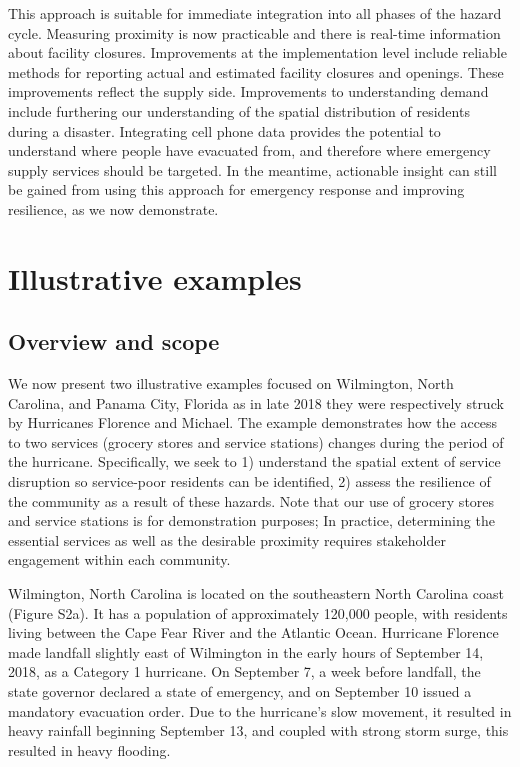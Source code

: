 \documentclass[9pt,twocolumn,twoside,lineno]{pnas-new}
\begin{document}
This approach is suitable for immediate integration into all phases of the hazard cycle. 
Measuring proximity is now practicable and there is real-time information about facility closures. 
Improvements at the implementation level include reliable methods for reporting actual and estimated facility closures and openings. 
These improvements reflect the supply side. 
Improvements to understanding demand include furthering our understanding of the spatial distribution of residents during a disaster.
Integrating cell phone data provides the potential to understand where people have evacuated from, and therefore where emergency supply services should be targeted. 
In the meantime, actionable insight can still be gained from using this approach for emergency response and improving resilience, as we now demonstrate.

\section*{Illustrative examples}
\subsection*{Overview and scope}
We now present two illustrative examples focused on Wilmington, North Carolina, and Panama City, Florida as in late 2018 they were respectively struck by Hurricanes Florence and Michael. 
The example demonstrates how the access to two services (grocery stores and service stations) changes during the period of the hurricane. 
Specifically, we seek to 1) understand the spatial extent of service disruption so service-poor residents can be identified, 2) assess the resilience of the community as a result of these hazards. 
Note that our use of grocery stores and service stations is for demonstration purposes; In practice, determining the essential services as well as the desirable proximity requires stakeholder engagement within each community. 

Wilmington, North Carolina is located on the southeastern North Carolina coast (Figure S2a).
It has a population of approximately 120,000 people, with residents living between the Cape Fear River and the Atlantic Ocean. 
Hurricane Florence made landfall slightly east of Wilmington in the early hours of September 14, 2018, as a Category 1 hurricane. 
On September 7, a week before landfall, the state governor declared a state of emergency, and on September 10 issued a mandatory evacuation order. 
Due to the hurricane’s slow movement, it resulted in heavy rainfall beginning September 13, and coupled with strong storm surge, this resulted in heavy flooding. 
\end{document}

